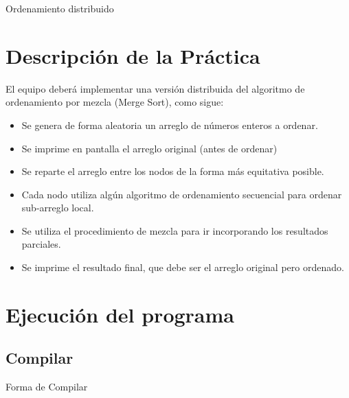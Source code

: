 \documentclass[a4paper,12pt]{article}
\begin{document}


\newpage

\begin{center}
    {\huge Ordenamiento distribuido}
\end{center}


\section*{Descripción de la Práctica}


El equipo deberá implementar una versión distribuida del algoritmo de ordenamiento por
mezcla (Merge Sort), como sigue:
\begin{itemize}
    \item Se genera de forma aleatoria un arreglo de números enteros a ordenar.
    \item Se imprime en pantalla el arreglo original (antes de ordenar)
    \item Se reparte el arreglo entre los nodos de la forma más equitativa posible.
    \item Cada nodo utiliza algún algoritmo de ordenamiento secuencial para ordenar sub-arreglo local.
    \item Se utiliza el procedimiento de mezcla para ir incorporando los resultados parciales.
    \item Se imprime el resultado final, que debe ser el arreglo original pero ordenado.
\end{itemize}



\section*{Ejecución del programa}

\subsection*{Compilar}
\begin{center}    
    Forma de Compilar 
\end{center}
\end{document}
